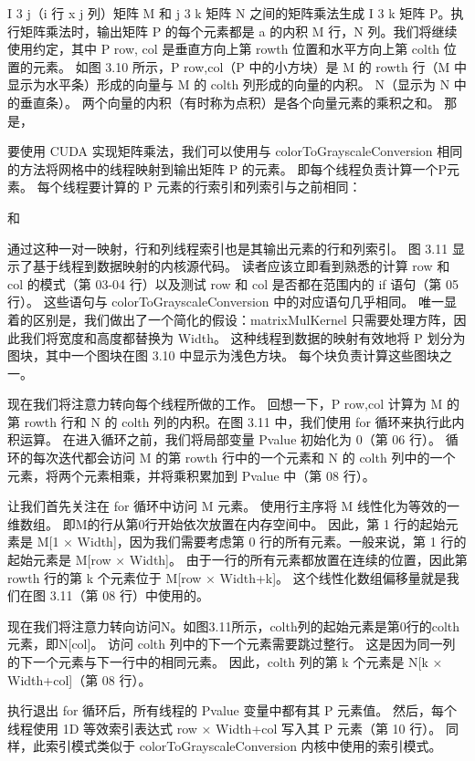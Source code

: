 I 3 j（i 行 x j 列）矩阵 M 和 j 3 k 矩阵 N 之间的矩阵乘法生成 I 3 k 矩阵 P。执行矩阵乘法时，输出矩阵 P 的每个元素都是 a 的内积 M 行，N 列。我们将继续使用约定，其中 P row, col 是垂直方向上第 rowth 位置和水平方向上第 colth 位置的元素。 如图 3.10 所示，P row,col（P 中的小方块）是 M 的 rowth 行（M 中显示为水平条）形成的向量与 M 的 colth 列形成的向量的内积。 N（显示为 N 中的垂直条）。 两个向量的内积（有时称为点积）是各个向量元素的乘积之和。 那是，

要使用 CUDA 实现矩阵乘法，我们可以使用与 colorToGrayscaleConversion 相同的方法将网格中的线程映射到输出矩阵 P 的元素。 即每个线程负责计算一个P元素。 每个线程要计算的 P 元素的行索引和列索引与之前相同：

和

通过这种一对一映射，行和列线程索引也是其输出元素的行和列索引。 图 3.11 显示了基于线程到数据映射的内核源代码。 读者应该立即看到熟悉的计算 row 和 col 的模式（第 03-04 行）以及测试 row 和 col 是否都在范围内的 if 语句（第 05 行）。 这些语句与 colorToGrayscaleConversion 中的对应语句几乎相同。 唯一显着的区别是，我们做出了一个简化的假设：matrixMulKernel 只需要处理方阵，因此我们将宽度和高度都替换为 Width。 这种线程到数据的映射有效地将 P 划分为图块，其中一个图块在图 3.10 中显示为浅色方块。 每个块负责计算这些图块之一。

现在我们将注意力转向每个线程所做的工作。 回想一下，P row,col 计算为 M 的第 rowth 行和 N 的 colth 列的内积。在图 3.11 中，我们使用 for 循环来执行此内积运算。 在进入循环之前，我们将局部变量 Pvalue 初始化为 0（第 06 行）。 循环的每次迭代都会访问 M 的第 rowth 行中的一个元素和 N 的 colth 列中的一个元素，将两个元素相乘，并将乘积累加到 Pvalue 中（第 08 行）。

让我们首先关注在 for 循环中访问 M 元素。 使用行主序将 M 线性化为等效的一维数组。 即M的行从第0行开始依次放置在内存空间中。 因此，第 1 行的起始元素是 M[1 × Width]，因为我们需要考虑第 0 行的所有元素。一般来说，第 1 行的起始元素是 M[row × Width]。 由于一行的所有元素都放置在连续的位置，因此第 rowth 行的第 k 个元素位于 M[row × Width+k]。 这个线性化数组偏移量就是我们在图 3.11（第 08 行）中使用的。

现在我们将注意力转向访问N。如图3.11所示，colth列的起始元素是第0行的colth元素，即N[col]。 访问 colth 列中的下一个元素需要跳过整行。 这是因为同一列的下一个元素与下一行中的相同元素。 因此，colth 列的第 k 个元素是 N[k × Width+col]（第 08 行）。

执行退出 for 循环后，所有线程的 Pvalue 变量中都有其 P 元素值。 然后，每个线程使用 1D 等效索引表达式 row × Width+col 写入其 P 元素（第 10 行）。 同样，此索引模式类似于 colorToGrayscaleConversion 内核中使用的索引模式。

